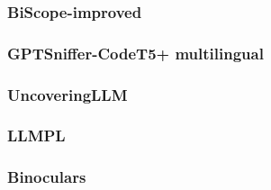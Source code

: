 \subsubsection{BiScope-improved}


\subsubsection{GPTSniffer-CodeT5+ multilingual}



\subsubsection{UncoveringLLM}




\subsubsection{LLMPL}



\subsubsection{Binoculars}